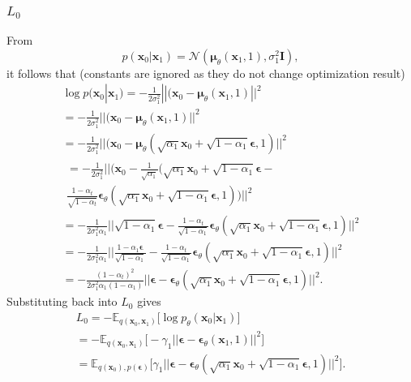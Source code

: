 \documentclass[10pt]{article}
\begin{document}
\subsubsection{ $L_0$}
From
\begin{equation}\label{eq:p_dist}
    p(\textbf{x}_0 | \textbf{x}_1) = \mathcal{N}(\bm{\mu}_{\theta}(\textbf{x}_{1}, 1)  , \sigma^2_1 \mathbf{I}),
\end{equation}
it follows that (constants are ignored as they do not change optimization result)
\begin{gather}
    \log p(\textbf{x}_0 | \textbf{x}_1) =
     -\frac{1}{2\sigma^2_1} ||(\textbf{x}_0 - \bm{\mu}_{\theta}(\textbf{x}_{1}, 1)  ||^2 \\
    = -\frac{1}{2\sigma^2_1} ||(\textbf{x}_0 - \bm{\mu}_{\theta}(\textbf{x}_{1}, 1)  ||^2 \\
    =  -\frac{1}{2\sigma^2_1} ||(\textbf{x}_0 - \bm{\mu}_{\theta}(\sqrt{\alpha_1}\textbf{x}_{0} + \sqrt{1 - \alpha_1}\bm{\epsilon}, 1)   ||^2  \\
    \begin{gathered}
    = -\frac{1}{2\sigma^2_1} ||(\textbf{x}_0 - 
    \frac{1}{\sqrt{\alpha_1}}\Big(\sqrt{\alpha_1}\textbf{x}_{0} + \sqrt{1 - \alpha_1}\bm{\epsilon} - \\
    \frac{1 - \alpha_t}{\sqrt{1 - \overline{\alpha}_t}}
    \bm{\epsilon}_{\theta}(\sqrt{\alpha_1}\textbf{x}_{0} + \sqrt{1 - \alpha_1}\bm{\epsilon}, 1) \Big) ||^2 
    \end{gathered}\\
    = -\frac{1}{2\sigma^2_1 \alpha_1} ||
      \sqrt{1 - \alpha_1}\bm{\epsilon} - 
    \frac{1 - \alpha_t}{\sqrt{1 - \alpha_1 }}
    \bm{\epsilon}_{\theta}(\sqrt{\alpha_1}\textbf{x}_{0} + \sqrt{1 - \alpha_1}\bm{\epsilon}, 1)  ||^2\\
    = -\frac{1}{2\sigma^2_1 \alpha_1} ||
     \frac{1 - \alpha_1\bm{\epsilon}}{\sqrt{1 - \alpha_1}} - 
    \frac{1 - \alpha_t}{\sqrt{1 -\alpha_1}}
    \bm{\epsilon}_{\theta}(\sqrt{\alpha_1}\textbf{x}_{0} + \sqrt{1 - \alpha_1}\bm{\epsilon}, 1)  ||^2\\
    =-\frac{(1 - \alpha_t)^2}{2\sigma^2_1 \alpha_1 (1 - \alpha_1)}
    || \bm{\epsilon} -
    \bm{\epsilon}_{\theta}(\sqrt{\alpha_1}\textbf{x}_{0} + \sqrt{1 - \alpha_1}\bm{\epsilon}, 1) ||^2.
\end{gather}
Substituting back into $L_0$ gives
\begin{gather}
L_0 = -\mathbb{E}_{q(\textbf{x}_{0}, \textbf{x}_{1})} 
    \Bigg[\log  p_{\theta}( \textbf{x}_{0}|  \textbf{x}_{1}  ) \Bigg] \\
    = -\mathbb{E}_{q(\textbf{x}_{0}, \textbf{x}_{1})} 
    \Bigg[-\gamma_1  || \bm{\epsilon} -
    \bm{\epsilon}_{\theta}(\textbf{x}_{1},1) ||^2\Bigg] \\ 
    = \mathbb{E}_{q(\textbf{x}_{0}), p(\bm{\epsilon})} 
    \Bigg[ \gamma_1 || \bm{\epsilon} -
    \bm{\epsilon}_{\theta}(\sqrt{\alpha_1}\textbf{x}_{0} + \sqrt{1 - \alpha_1}\bm{\epsilon}, 1) ||^2 \Bigg].
\end{gather}
\end{document}
